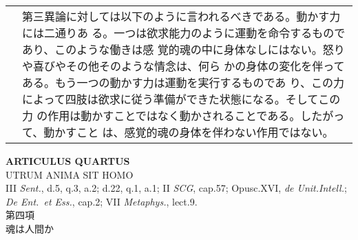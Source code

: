 \documentclass[10pt]{jsarticle} %
\begin{document}
\begin{longtable}{p{21em}p{21em}}
&

第三異論に対しては以下のように言われるべきである。動かす力には二通りあ
る。一つは欲求能力のように運動を命令するものであり、このような働きは感
覚的魂の中に身体なしにはない。怒りや喜びやその他そのような情念は、何ら
かの身体の変化を伴ってある。もう一つの動かす力は運動を実行するものであ
り、この力によって四肢は欲求に従う準備ができた状態になる。そしてこの力
の作用は動かすことではなく動かされることである。したがって、動かすこと
は、感覚的魂の身体を伴わない作用ではない。


\end{longtable}
\newpage


\begin{center}
{\Large {\bf ARTICULUS QUARTUS}}\\
{\large UTRUM ANIMA SIT HOMO}\\
{\footnotesize III {\itshape Sent.}, d.5, q.3, a.2; d.22, q.1, a.1; II
 {\itshape SCG}, cap.57; Opusc.XVI, {\itshape de Unit.Intell.};
 {\itshape De Ent.~et Ess.}, cap.2; VII {\itshape Metaphys.}, lect.9.}\\
{\Large 第四項\\魂は人間か}
\end{center}
\end{document}
